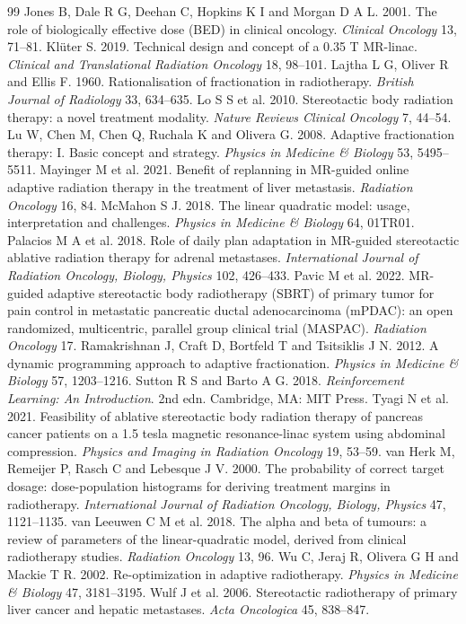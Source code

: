 \documentclass[11pt]{article}
\begin{document}
\begin{thebibliography}{99}
 Jones B, Dale R G, Deehan C, Hopkins K I and Morgan D A L. 2001. The role of biologically effective dose (BED) in clinical oncology. \textit{Clinical Oncology} 13, 71--81.
 Kl\"uter S. 2019. Technical design and concept of a 0.35 T MR-linac. \textit{Clinical and Translational Radiation Oncology} 18, 98--101.
 Lajtha L G, Oliver R and Ellis F. 1960. Rationalisation of fractionation in radiotherapy. \textit{British Journal of Radiology} 33, 634--635.
 Lo S S et al. 2010. Stereotactic body radiation therapy: a novel treatment modality. \textit{Nature Reviews Clinical Oncology} 7, 44--54.
 Lu W, Chen M, Chen Q, Ruchala K and Olivera G. 2008. Adaptive fractionation therapy: I. Basic concept and strategy. \textit{Physics in Medicine \& Biology} 53, 5495--5511.
 Mayinger M et al. 2021. Benefit of replanning in MR-guided online adaptive radiation therapy in the treatment of liver metastasis. \textit{Radiation Oncology} 16, 84.
 McMahon S J. 2018. The linear quadratic model: usage, interpretation and challenges. \textit{Physics in Medicine \& Biology} 64, 01TR01.
 Palacios M A et al. 2018. Role of daily plan adaptation in MR-guided stereotactic ablative radiation therapy for adrenal metastases. \textit{International Journal of Radiation Oncology, Biology, Physics} 102, 426--433.
 Pavic M et al. 2022. MR-guided adaptive stereotactic body radiotherapy (SBRT) of primary tumor for pain control in metastatic pancreatic ductal adenocarcinoma (mPDAC): an open randomized, multicentric, parallel group clinical trial (MASPAC). \textit{Radiation Oncology} 17.
 Ramakrishnan J, Craft D, Bortfeld T and Tsitsiklis J N. 2012. A dynamic programming approach to adaptive fractionation. \textit{Physics in Medicine \& Biology} 57, 1203--1216.
 Sutton R S and Barto A G. 2018. \textit{Reinforcement Learning: An Introduction}. 2nd edn. Cambridge, MA: MIT Press.
 Tyagi N et al. 2021. Feasibility of ablative stereotactic body radiation therapy of pancreas cancer patients on a 1.5 tesla magnetic resonance-linac system using abdominal compression. \textit{Physics and Imaging in Radiation Oncology} 19, 53--59.
 van Herk M, Remeijer P, Rasch C and Lebesque J V. 2000. The probability of correct target dosage: dose-population histograms for deriving treatment margins in radiotherapy. \textit{International Journal of Radiation Oncology, Biology, Physics} 47, 1121--1135.
 van Leeuwen C M et al. 2018. The alpha and beta of tumours: a review of parameters of the linear-quadratic model, derived from clinical radiotherapy studies. \textit{Radiation Oncology} 13, 96.
 Wu C, Jeraj R, Olivera G H and Mackie T R. 2002. Re-optimization in adaptive radiotherapy. \textit{Physics in Medicine \& Biology} 47, 3181--3195.
 Wulf J et al. 2006. Stereotactic radiotherapy of primary liver cancer and hepatic metastases. \textit{Acta Oncologica} 45, 838--847.

\end{thebibliography}
\end{document}
